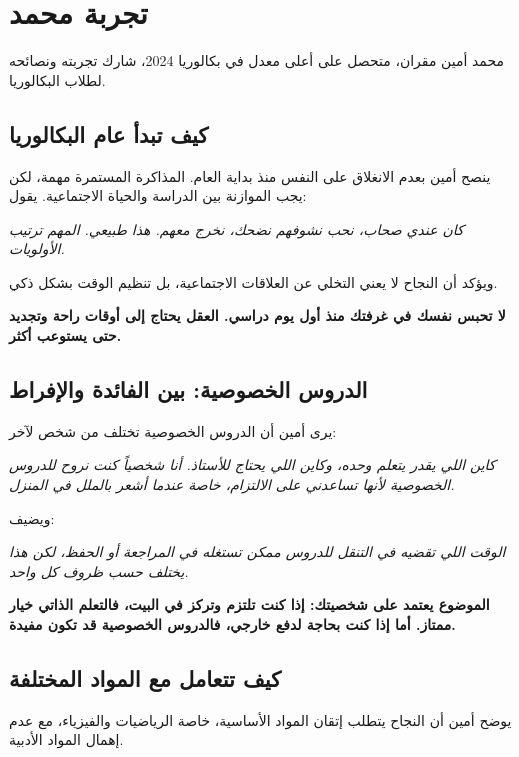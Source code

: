 \documentclass[12pt,a4paper]{book}
\newcommand{\quoteAr}[1]{%
	\begin{myquote}
		\itshape #1
	\end{myquote}
}
\newcommand{\importantAr}[1]{%
	\begin{important}
		\bfseries #1
	\end{important}
}
\begin{document}
	
	\section{تجربة محمد}
	
	محمد أمين مقران، متحصل على أعلى معدل في بكالوريا 2024، شارك تجربته ونصائحه لطلاب البكالوريا.
	
	
	\subsection{كيف تبدأ عام البكالوريا}
	
	
	ينصح أمين بعدم الانغلاق على النفس منذ بداية العام. المذاكرة المستمرة مهمة، لكن يجب الموازنة بين الدراسة والحياة الاجتماعية. يقول:
	
	\quoteAr{كان عندي صحاب، نحب نشوفهم نضحك، نخرج معهم. هذا طبيعي. المهم ترتيب الأولويات.}
	
	ويؤكد أن النجاح لا يعني التخلي عن العلاقات الاجتماعية، بل تنظيم الوقت بشكل ذكي.
	
	\importantAr{لا تحبس نفسك في غرفتك منذ أول يوم دراسي. العقل يحتاج إلى أوقات راحة وتجديد حتى يستوعب أكثر.}
	
	
	\subsection{الدروس الخصوصية: بين الفائدة والإفراط}
	
	يرى أمين أن الدروس الخصوصية تختلف من شخص لآخر:
	
	\quoteAr{كاين اللي يقدر يتعلم وحده، وكاين اللي يحتاج للأستاذ. أنا شخصياً كنت نروح للدروس الخصوصية لأنها تساعدني على الالتزام، خاصة عندما أشعر بالملل في المنزل.}
	
	ويضيف:
	\quoteAr{الوقت اللي تقضيه في التنقل للدروس ممكن تستغله في المراجعة أو الحفظ، لكن هذا يختلف حسب ظروف كل واحد.}
	
	\importantAr{الموضوع يعتمد على شخصيتك: إذا كنت تلتزم وتركز في البيت، فالتعلم الذاتي خيار ممتاز. أما إذا كنت بحاجة لدفع خارجي، \newline فالدروس الخصوصية قد تكون مفيدة.}
	
	
	\subsection{كيف تتعامل مع المواد المختلفة}
	\label{sec:ideal-daily-system2}
	يوضح أمين أن النجاح يتطلب إتقان المواد الأساسية، خاصة الرياضيات والفيزياء، مع عدم إهمال المواد الأدبية.
	
\end{document}
